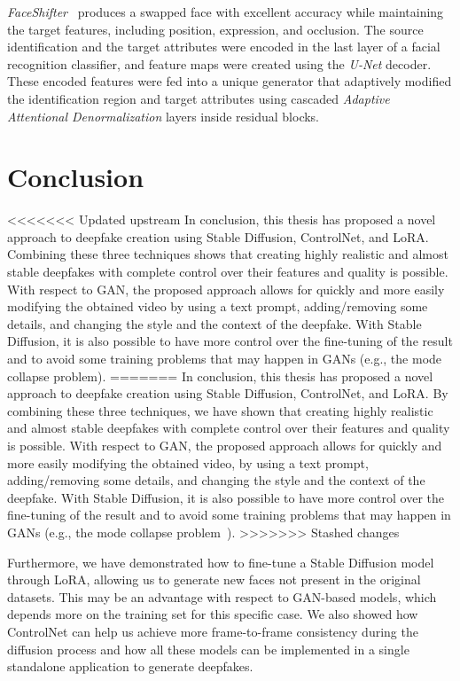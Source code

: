 \documentclass[preprint]{elsarticle}
\begin{document}
\emph{FaceShifter}~\cite{faceshifter} produces a swapped face with excellent accuracy while maintaining the target features, including position, expression, and occlusion. The source identification and the target attributes were encoded in the last layer of a facial recognition classifier, and feature maps were created using the \emph{U-Net} decoder. These encoded features were fed into a unique generator that adaptively modified the identification region and target attributes using cascaded \emph{Adaptive Attentional Denormalization} layers inside residual blocks.



\section{Conclusion}\label{sect:conclusion}
<<<<<<< Updated upstream
In conclusion, this thesis has proposed a novel approach to deepfake creation using Stable Diffusion, ControlNet, and LoRA. Combining these three techniques shows that creating highly realistic and almost stable deepfakes with complete control over their features and quality is possible. With respect to GAN, the proposed approach allows for quickly and more easily modifying the obtained video by  using a text prompt, adding/removing some details, and changing the style  and the context of the deepfake. With Stable Diffusion, it is also possible to have more control over the fine-tuning of the result and to avoid some training problems that may happen in GANs (e.g., the mode collapse problem).
=======
In conclusion, this thesis has proposed a novel approach to deepfake creation using Stable Diffusion, ControlNet, and LoRA. By combining these three techniques, we have shown that creating highly realistic and almost stable deepfakes with complete control over their features and quality is possible. With respect to GAN, the proposed approach allows for quickly and more easily modifying the obtained video, by  using a text prompt, adding/removing some details, and changing the style  and the context of the deepfake. With Stable Diffusion, it is also possible to have more control over the fine-tuning of the result and to avoid some training problems that may happen in GANs (e.g., the mode collapse problem~\cite{collapse}).
>>>>>>> Stashed changes

Furthermore, we have demonstrated how to fine-tune a Stable Diffusion model through LoRA,  allowing us to generate new faces not present in the original datasets. This may be an advantage with respect to GAN-based models, which depends more on the training set for this specific case. We also showed how ControlNet can help us achieve more frame-to-frame consistency during the diffusion process and how all these models can be implemented in a single standalone application to generate deepfakes. 
\end{document}

